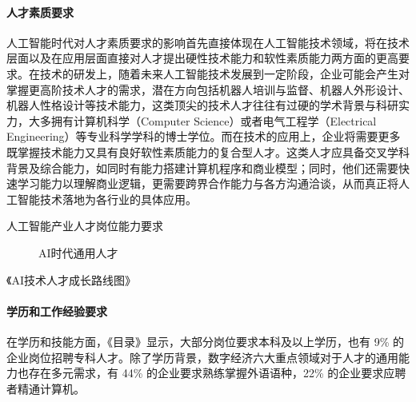 \documentclass[letterpaper,10pt,english]{sphinxmanual}
\begin{document}
\paragraph{人才素质要求}
\label{\detokenize{chapter_project/AI_talents:id13}}
人工智能时代对人才素质要求的影响首先直接体现在人工智能技术领域，将在技术层面以及在应用层面直接对人才提出硬性技术能力和软性素质能力两方面的更高要求。在技术的研发上，随着未来人工智能技术发展到一定阶段，企业可能会产生对掌握更高阶技术人才的需求，潜在方向包括机器人培训与监督、机器人外形设计、机器人性格设计等技术能力，这类顶尖的技术人才往往有过硬的学术背景与科研实力，大多拥有计算机科学（Computer
Science）或者电气工程学（Electrical
Engineering）等专业科学学科的博士学位。而在技术的应用上，企业将需要更多既掌握技术能力又具有良好软性素质能力的复合型人才。这类人才应具备交叉学科背景及综合能力，如同时有能力搭建计算机程序和商业模型；同时，他们还需要快速学习能力以理解商业逻辑，更需要跨界合作能力与各方沟通洽谈，从而真正将人工智能技术落地为各行业的具体应用。
%
\begin{footnote}[747]\sphinxAtStartFootnote
{}
%
\end{footnote}

人工智能产业人才岗位能力要求%
\begin{footnote}[748]\sphinxAtStartFootnote
{}
%
\end{footnote}

\begin{figure}[H]
\centering
\capstart

\noindent{}
\caption{AI时代通用人才\sphinxfootnotemark[749]}\label{\detokenize{chapter_project/AI_talents:id22}}\end{figure}
%
\begin{footnotetext}[749]\sphinxAtStartFootnote
{}
%
\end{footnotetext}\ignorespaces 
《AI技术人才成长路线图》


\paragraph{学历和工作经验要求}
\label{\detokenize{chapter_project/AI_talents:id14}}
在学历和技能方面，《目录》显示，大部分岗位要求本科及以上学历，也有 9\%
的企业岗位招聘专科人才。除了学历背景，数字经济六大重点领域对于人才的通用能力也存在多元需求，有
44\% 的企业要求熟练掌握外语语种，22\% 的企业要求应聘者精通计算机。
\end{document}

